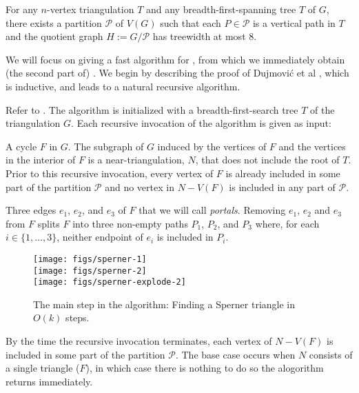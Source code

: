 \documentclass[kpfonts]{patmorin}
\begin{document}
\begin{thm}
  For any $n$-vertex triangulation $T$ and any breadth-first-spanning tree $T$ of $G$, there exists a partition $\mathcal{P}$ of $V(G)$ such that each $P\in\mathcal{P}$ is a vertical path in $T$ and the quotient graph $H:=G/\mathcal{P}$ has treewidth at most $8$.
\end{thm}

We will focus on giving a fast algorithm for , from which we immediately obtain (the second part of) .  We begin by describing the proof of Dujmović et al \cite{dujmovic.joret.ea:planar}, which is inductive, and leads to a natural recursive algorithm.

Refer to . The algorithm is initialized with a breadth-first-search tree $T$ of the triangulation $G$.  Each recursive invocation of the algorithm is given as input:
\begin{compactenum}
  \item A cycle $F$ in $G$. The subgraph of $G$ induced by the vertices of $F$ and the vertices in the interior of $F$ is a near-triangulation, $N$, that does not include the root of $T$.  Prior to this recursive invocation, every vertex of $F$ is already included in some part of the partition $\mathcal{P}$ and no vertex in $N-V(F)$ is included in any part of $\mathcal{P}$.

  \item Three edges $e_1$, $e_2$, and $e_3$ of $F$ that we will call \emph{portals}.  Removing $e_1$, $e_2$ and $e_3$ from $F$ splits $F$ into three non-empty paths $P_1$, $P_2$, and $P_3$ where, for each $i\in\{1,\ldots,3\}$, neither endpoint of $e_i$ is included in $P_i$.
\end{compactenum}

\begin{figure}
  \begin{center}
    \texttt{[image: figs/sperner-1]} \\[1ex]
    \texttt{[image: figs/sperner-2]} \\[1ex]
    \texttt{[image: figs/sperner-explode-2]}
  \end{center}
  \caption{The main step in the algorithm: Finding a Sperner triangle in $O(k)$ steps.}
\end{figure}

By the time the recursive invocation terminates, each vertex of $N-V(F)$ is included in some part of the partition $\mathcal{P}$.  The base case occurs when $N$ consists of a single triangle ($F$), in which case there is nothing to do so the alogorithm returns immediately.
\end{document}
